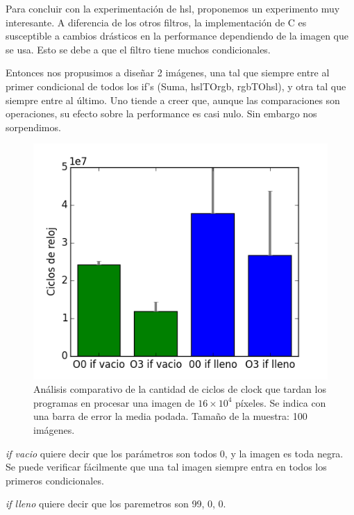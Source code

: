 Para concluir con la experimentación de hsl, proponemos un experimento muy interesante. A diferencia de los otros filtros, la implementación de C es susceptible a cambios drásticos en la performance dependiendo de la imagen que se usa. Esto se debe a que el filtro tiene muchos condicionales.

Entonces nos propusimos a diseñar 2 imágenes, una tal que siempre entre al primer condicional de todos los if's (Suma, hslTOrgb, rgbTOhsl), y otra tal que siempre entre al último. Uno tiende a creer que, aunque las comparaciones son operaciones, su efecto sobre la performance es casi nulo. Sin embargo nos sorpendimos.


\begin{figure}[H] 
	\centering
  \includegraphics[scale=0.7]{hsl-ifs.png}
  \caption{Análisis comparativo de la cantidad de ciclos de clock que tardan los programas en procesar una imagen de $16\times 10^4$ píxeles. Se indica con una barra de error la media podada. Tamaño de la muestra: 100 imágenes.}
\end{figure}


\textit{if vacio} quiere decir que los parámetros son todos 0, y la imagen es toda negra. Se puede verificar fácilmente que una tal imagen siempre entra en todos los primeros condicionales.

\textit{if lleno} quiere decir que los paremetros son 99, 0, 0.









